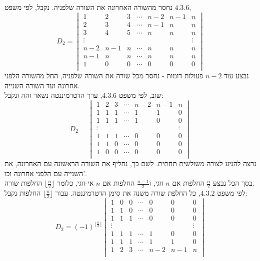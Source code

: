 \documentclass{article}
\begin{document}
נחסר מהשורה האחרונה את השורה שלפניה. נקבל, לפי משפט $4.3.6$,
\[
    D_2 = \begin{vmatrix}
        1      & 2   & 3 & \cdots & n-2 & n-1 & n      \\
        2      & 3   & 4 & \cdots & n-1 & n   & n      \\
        3      & 4   & 5 & \cdots & n   & n   & n      \\
        \vdots &     &   &        &     &     & \vdots \\
        n-2    & n-1 & n & \cdots & n   & n   & n      \\
        n-1    & n   & n & \cdots & n   & n   & n      \\
        1      & 0   & 0 & \cdots & 0   & 0   & 0      \\
    \end{vmatrix}
\]
נבצע עוד $n-2$
פעולות דומות - נחסר מכל שורה את השורה שלפניה,
החל מהשורה הלפני אחרונה ועד השורה השנייה. \\
שוב, לפי משפט $4.3.6$,
ערך הדטרמיננטה נשאר זהה ונקבל:
\[
    D_2 = \begin{vmatrix}
        1      & 2 & 3 & \cdots & n-2 & n-1 & n      \\
        1      & 1 & 1 & \cdots & 1   & 1   & 0      \\
        1      & 1 & 1 & \cdots & 1   & 0   & 0      \\
        \vdots &   &   &        &     &     & \vdots \\
        1      & 1 & 1 & \cdots & 0   & 0   & 0      \\
        1      & 1 & 0 & \cdots & 0   & 0   & 0      \\
        1      & 0 & 0 & \cdots & 0   & 0   & 0      \\
    \end{vmatrix}
\]
נרצה להגיע לצורה משולשית תחתית.
לשם כך, נחליף את השורה הראשונה עם האחרונה, את השנייה עם הלפני אחרונה וכו'. \\
בסך הכל נבצע $\frac n 2$ החלפות אם $n$ זוגי,
ו$\frac{n-1}{2}$ החלפות אם $n$ אי-זוגי,
כלומר $\lfloor \frac n 2 \rfloor$ החלפות שורה. \\
לפי משפט $4.3.2$,
כל החלפת שורה משנה את סימן הדטרמיננטה. עבור $\lfloor \frac n 2 \rfloor$
החלפות נקבל:
\[
    D_2 = (-1)^{\lfloor \frac n 2 \rfloor}\begin{vmatrix}
        1      & 0 & 0 & \cdots & 0   & 0   & 0      \\
        1      & 1 & 0 & \cdots & 0   & 0   & 0      \\
        1      & 1 & 1 & \cdots & 0   & 0   & 0      \\
        \vdots &   &   &        &     &     & \vdots \\
        1      & 1 & 1 & \cdots & 1   & 0   & 0      \\
        1      & 1 & 1 & \cdots & 1   & 1   & 0      \\
        1      & 2 & 3 & \cdots & n-2 & n-1 & n      \\
    \end{vmatrix}
\]
\end{document}

